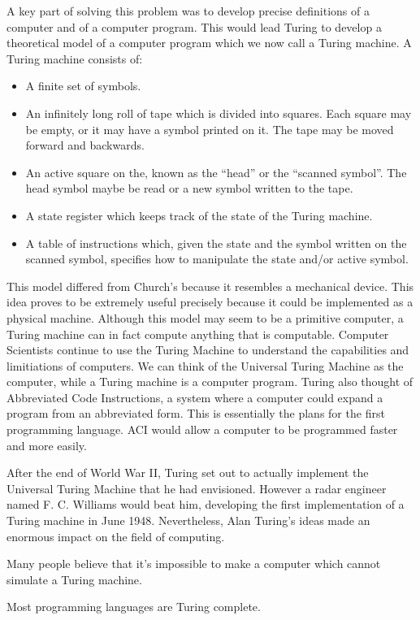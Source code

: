 \documentclass[12pt]{article}
\theoremstyle{mystyle}
\begin{document}
A key part of solving this problem was to develop precise definitions of a
computer and of a computer program. This would lead Turing to develop a
theoretical model of a computer program which we now call a Turing machine. A
Turing machine consists of:
\begin{itemize}
  \item A finite set of symbols.
  \item An infinitely long roll of tape which is divided into squares. Each
    square may be empty, or it may have a symbol printed on it. The tape may be
    moved forward and backwards.
  \item An active square on the, known as the ``head'' or the ``scanned
    symbol''. The head symbol maybe be read or a new symbol written to the tape.
  \item A state register which keeps track of the state of the Turing machine.
  \item A table of instructions which, given the state and the symbol written on
    the scanned symbol, specifies how to manipulate the state and/or active
    symbol.
\end{itemize}
This model differed from Church's because it resembles a mechanical device. This
idea proves to be extremely useful precisely because it could be implemented as
a physical machine. Although this model may seem to be a primitive computer, a
Turing machine can in fact compute anything that is computable. Computer
Scientists continue to use the Turing Machine to understand the capabilities and
limitiations of computers. We can think of the Universal Turing Machine as the
computer, while a Turing machine is a computer program. Turing also thought of
Abbreviated Code Instructions, a system where a computer could expand a program
from an abbreviated form. This is essentially the plans for the first
programming language. ACI would allow a computer to be programmed faster and
more easily.

After the end of World War II, Turing set out to actually implement the
Universal Turing Machine that he had envisioned. However a radar engineer named 
F. C. Williams would beat him, developing the first implementation of a 
Turing machine in June 1948. Nevertheless, Alan Turing's ideas made an enormous
impact on the field of computing.


Many people believe that it's impossible to make a computer which cannot
simulate a Turing machine.

Most programming languages are Turing complete.
\end{document}
